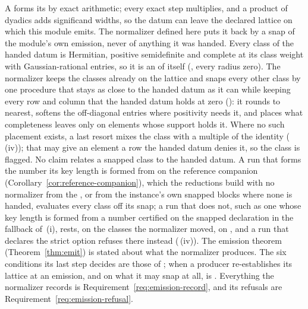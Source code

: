 A  forms its  by exact
arithmetic; every exact step multiplies, and a product of dyadics adds
significand widths, so the datum can leave the declared lattice on which this
module emits. The normalizer defined here puts it back by a snap of the
module's own emission, never of anything it was handed. Every class of the
handed datum is Hermitian, positive semidefinite and complete at its class
weight with Gaussian-rational entries, so it is an  of
itself (, every radius zero). The
normalizer keeps the classes already on the lattice and snaps every other
class by one procedure that stays as close to the handed datum as it can
while keeping every row and column that the handed datum holds at zero
(): it rounds to nearest, softens the
off-diagonal entries where positivity needs it, and places what completeness
leaves only on elements whose support holds it. Where no such placement
exists, a last resort mixes the class with a multiple of the identity
(\,(iv)); that may give an element a
row the handed datum denies it, so the class is flagged. No claim relates a
snapped class to the handed datum. A run that forms the number its key
length is formed from on the reference companion
(Corollary~\ref{cor:reference-companion}), which the reductions build with no
normalizer from the , or from the instance's own
snapped blocks where none is handed, evaluates every class off its snap; a run that does not, such as one whose
key length is formed from a number certified on the snapped declaration in
the fallback of \,(i),
rests, on the classes the
normalizer moved, on , and a run
that declares the strict option refuses there instead
(\,(iv)). The emission theorem
(Theorem~\ref{thm:emit}) is stated about what the normalizer produces. The
six conditions its last step decides are those of
; when a producer re-establishes its
lattice at an emission, and on what it may snap at all, is
. Everything the normalizer records is
Requirement~\ref{req:emission-record}, and its refusals are
Requirement~\ref{req:emission-refusal}.


